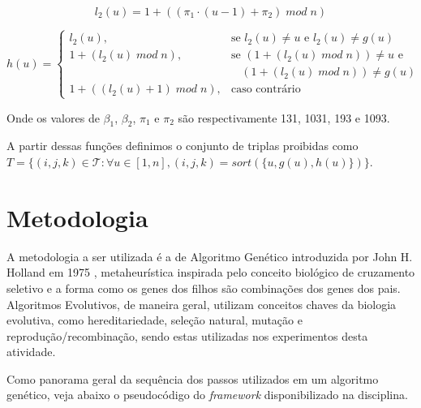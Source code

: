 \documentclass{MO824}
\begin{document}
    \begin{equation*}
    l_2(u) = 1 + ((\pi_1 \cdot (u - 1) + \pi_2 ) \; mod \; n) 
    \end{equation*}
    
    
    \begin{equation*}
    h(u) = \begin{cases} l_2(u), & \mbox{se } l_2(u) \neq u  \mbox{ e } l_2(u) \neq g(u)\\
                        1 + (l_2(u) \; mod \; n), & \mbox{se } (1+(l_2(u) \; mod \; n)) \neq u  \mbox{ e } \\ & ~~~~(1+(l_2(u) \; mod \; n)) \neq g(u)\\
                        1 + ((l_2(u)+1) \; mod \; n), & \mbox{caso contrário } \end{cases}
    \end{equation*}

    Onde os valores de $\beta_1$, $\beta_2$, $\pi_1$ e $\pi_2$ são respectivamente 131, 1031, 193 e 1093.
    
    A partir dessas funções definimos o conjunto de triplas proibidas como $T = \{(i,j,k)\in \mathcal{T} : 
    \forall u \in [1,n],  (i,j,k) = sort(\{u, g(u), h(u)\})\}$.

\section{Metodologia} \label{method}

A metodologia a ser utilizada é a de Algoritmo Genético introduzida por John H. Holland em 1975 \cite{johnholland}, metaheurística inspirada pelo conceito biológico de cruzamento seletivo e a forma como os genes dos filhos são combinações dos genes dos pais. Algoritmos Evolutivos, de maneira geral, utilizam conceitos chaves da biologia evolutiva, como hereditariedade, seleção natural, mutação e reprodução/recombinação, sendo estas utilizadas nos experimentos desta atividade.

Como panorama geral da sequência dos passos utilizados em um algoritmo genético, veja abaixo o pseudocódigo do \textit{framework} disponibilizado na disciplina.\\
\end{document}
